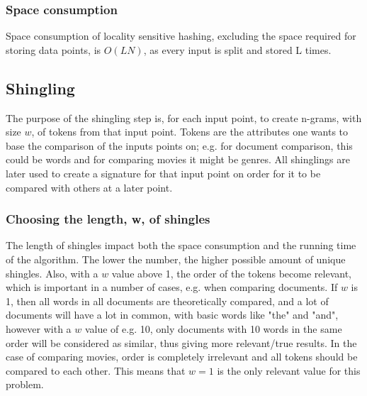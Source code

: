 \subsubsection{Space consumption}
Space consumption of locality sensitive hashing, excluding the space required for storing data points, is \(O(LN)\), as every input is split and stored L times.

\subsection{Shingling}
The purpose of the shingling step is, for each input point, to create n-grams, with size \(w\), of tokens from that input point. Tokens are the attributes one wants to base the comparison of the inputs points on; e.g. for document comparison, this could be words and for comparing movies it might be genres. All shinglings are later used to create a signature for that input point on order for it to be compared with others at a later point. 

\subsubsection{Choosing the length, w, of shingles}
The length of shingles impact both the space consumption and the running time of the algorithm. The lower the number, the higher possible amount of unique shingles. Also, with a \(w\) value above 1, the order of the tokens become relevant, which is important in a number of cases, e.g. when comparing documents. If \(w\) is 1, then all words in all documents are theoretically compared, and a lot of documents will have a lot in common, with basic words like "the" and "and", however with a \(w\) value of e.g. 10, only documents with 10 words in the same order will be considered as similar, thus giving more relevant/true results. In the case of comparing movies, order is completely irrelevant and all tokens should be compared to each other. This means that \(w=1\) is the only relevant value for this problem.
